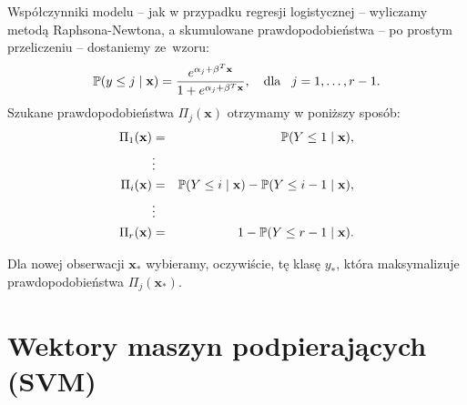 \documentclass{mini}
\begin{document}
Współczynniki modelu -- jak w przypadku regresji logistycznej -- wyliczamy metodą Raphsona-Newtona, a skumulowane prawdopodobieństwa -- po prostym przeliczeniu -- dostaniemy ze~wzoru:
$$
\mathbb{P}(y\leq j \hspace{1mm}|\hspace{1mm} \mathbf{x})=\dfrac{e^{\alpha_j+\mathbf{\beta}^T\mathbf{x}}}{1+e^{\alpha_j+\mathbf{\beta}^T\mathbf{x}}},\quad \textrm{dla}\hspace{3mm} j=1,\ldots,r-1.
$$ 
Szukane prawdopodobieństwa $\Pi_j(\mathbf{x})$ otrzymamy w poniższy sposób:
\begin{eqnarray*}
\Pi_1(\mathbf{x}) &=& \mathbb{P}(Y\leq 1 \hspace{1mm}|\hspace{1mm}\mathbf{x}),\\
&\vdots&\\
\Pi_i(\mathbf{x}) &=& \mathbb{P}(Y\leq i \hspace{1mm}|\hspace{1mm} \mathbf{x}) - \mathbb{P}(Y\leq i-1 \hspace{1mm}|\hspace{1mm} \mathbf{x}),\\
&\vdots&\\
\Pi_r(\mathbf{x}) &=& 1 - \mathbb{P}(Y\leq r-1 \hspace{1mm}|\hspace{1mm} \mathbf{x}).
\end{eqnarray*}

Dla nowej obserwacji $\mathbf{x}_{\ast}$ wybieramy, oczywiście, tę klasę $y_{\ast}$, która maksymalizuje prawdopodobieństwa $\Pi_j(\mathbf{x}_{\ast})$.

\section{Wektory maszyn podpierających (SVM)}
\end{document}
